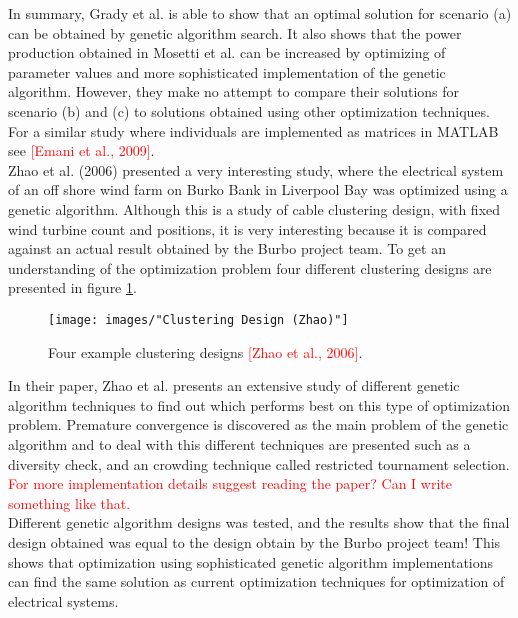 \noindent In summary, Grady et al. is able to show that an optimal solution for scenario (a) can be obtained by genetic algorithm search. It also shows that the power production obtained in Mosetti et al. can be increased by optimizing of parameter values and more sophisticated implementation of the genetic algorithm. However, they make no attempt to compare their solutions for scenario (b) and (c) to solutions obtained using other optimization techniques. For a similar study where individuals are implemented as matrices in MATLAB see \textcolor{red}{[Emani et al., 2009]}.\\


\noindent Zhao et al. (2006) presented a very interesting study, where the electrical system of an off shore wind farm on Burko Bank in Liverpool Bay was optimized using a genetic algorithm. Although this is a study of cable clustering design, with fixed wind turbine count and positions, it is very interesting because it is compared against an actual result obtained by the Burbo project team. To get an understanding of the optimization problem four different clustering designs are presented in figure \ref{Clustering Design}.\\


\begin{figure}[h!]
\begin{center}
\texttt{[image: images/"Clustering Design (Zhao)"]}
\caption{Four example clustering designs \textcolor{red}{[Zhao et al., 2006]}.}
\label{Clustering Design}
\end{center}
\end{figure}


\noindent In their paper, Zhao et al. presents an extensive study of different genetic algorithm techniques to find out which performs best on this type of optimization problem. Premature convergence is discovered as the main problem of the genetic algorithm and to deal with this different techniques are presented such as a diversity check, and an crowding technique called restricted tournament selection. \textcolor{red}{For more implementation details suggest reading the paper? Can I write something like that.}\\

\noindent Different genetic algorithm designs was tested, and the results show that the final design obtained was equal to the design obtain by the Burbo project team! This shows that optimization using sophisticated genetic algorithm implementations can find the same solution as current optimization techniques for optimization of electrical systems.\\



